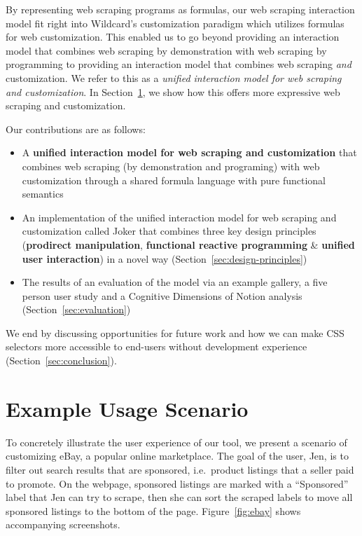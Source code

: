 \documentclass[sigconf,10pt]{acmart}
\providecommand{\tightlist}{%
  \setlength{\itemsep}{0pt}\setlength{\parskip}{0pt}}
\begin{document}
By representing web scraping programs as formulas, our web scraping
interaction model fit right into Wildcard's customization paradigm which
utilizes formulas for web customization. This enabled us to go beyond
providing an interaction model that combines web scraping by
demonstration with web scraping by programming to providing an
interaction model that combines web scraping \emph{and} customization.
We refer to this as a \emph{unified interaction model for web scraping
and customization}. In Section~\ref{sec:examples}, we show how this
offers more expressive web scraping and customization.

Our contributions are as follows:

\begin{itemize}
\tightlist
\item
  A \textbf{unified interaction model for web scraping and
  customization} that combines web scraping (by demonstration and
  programing) with web customization through a shared formula language
  with pure functional semantics
\item
  An implementation of the unified interaction model for web scraping
  and customization called Joker that combines three key design
  principles (\textbf{prodirect manipulation}, \textbf{functional
  reactive programming} \& \textbf{unified user interaction}) in a novel
  way (Section~\ref{sec:design-principles})
\item
  The results of an evaluation of the model via an example gallery, a
  five person user study and a Cognitive Dimensions of Notion analysis
  (Section~\ref{sec:evaluation})
\end{itemize}

We end by discussing opportunities for future work and how we can make
CSS selectors more accessible to end-users without development
experience (Section~\ref{sec:conclusion}).

\hypertarget{sec:examples}{%
\section{Example Usage Scenario}\label{sec:examples}}

To concretely illustrate the user experience of our tool, we present a
scenario of customizing eBay, a popular online marketplace. The goal of
the user, Jen, is to filter out search results that are sponsored,
i.e.~product listings that a seller paid to promote. On the webpage,
sponsored listings are marked with a ``Sponsored'' label that Jen can
try to scrape, then she can sort the scraped labels to move all
sponsored listings to the bottom of the page. Figure~\ref{fig:ebay}
shows accompanying screenshots.
\end{document}
